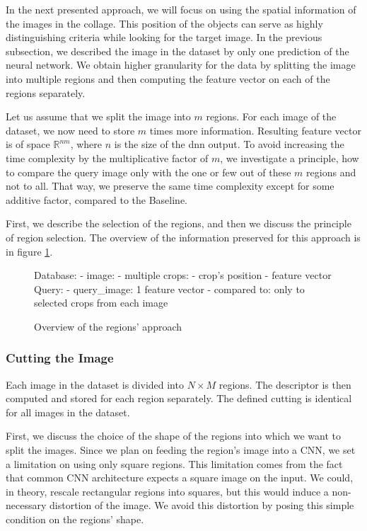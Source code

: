 In the next presented approach, we will focus on using the spatial information of the images in the collage. This position of the objects can serve as highly distinguishing criteria while looking for the target image. In the previous subsection, we described the image in the dataset by only one prediction of the neural network. We obtain higher granularity for the data by splitting the image into multiple regions and then computing the feature vector on each of the regions separately.

Let us assume that we split the image into $m$ regions. For each image of the dataset, we now need to store $m$ times more information. Resulting feature vector is of space $\mathbb{R}^{nm}$, where $n$ is the size of the \acrshort{dnn} output. To avoid increasing the time complexity by the multiplicative factor of $m$, we investigate a principle, how to compare the query image only with the one or few out of these $m$ regions and not to all. That way, we preserve the same time complexity except for some additive factor, compared to the Baseline.

First, we describe the selection of the regions, and then we discuss the principle of region selection. The overview of the information preserved for this approach is in figure \ref{fig:overview_regions}.

\begin{figure}
\centering
\begin{boxedverbatim}
Database:
    - image:
        - multiple crops:
            - crop's position
            - feature vector
Query:
    - query_image: 1 feature vector
    - compared to: only to selected crops from each image
\end{boxedverbatim}
\caption{Overview of the regions' approach}
\label{fig:overview_regions}
\end{figure}

\subsubsection{Cutting the Image}

Each image in the dataset is divided into $N \times M$ regions. The descriptor is then computed and stored for each region separately. The defined cutting is identical for all images in the dataset.

First, we discuss the choice of the shape of the regions into which we want to split the images. Since we plan on feeding the region's image into a CNN, we set a limitation on using only square regions. This limitation comes from the fact that common CNN architecture expects a square image on the input. We could, in theory, rescale rectangular regions into squares, but this would induce a non-necessary distortion of the image. We avoid this distortion by posing this simple condition on the regions' shape.

